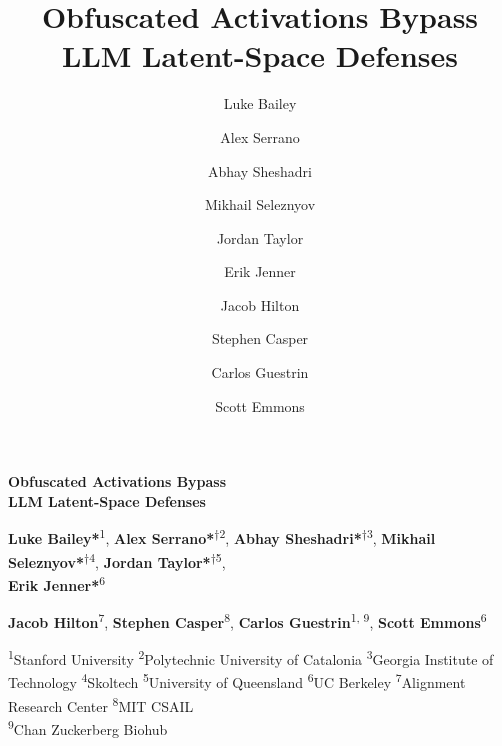 \documentclass{article}
\title{Obfuscated Activations Bypass LLM Latent-Space Defenses}
\date{} %
\author{Luke Bailey \and Alex Serrano \and Abhay Sheshadri \and Mikhail Seleznyov \and Jordan Taylor \and Erik Jenner \and Jacob Hilton \and Stephen Casper \and Carlos Guestrin \and Scott Emmons}
\begin{document}
\vspace*{-18mm}

{\centering
\LARGE\textbf{Obfuscated Activations Bypass\\LLM Latent-Space Defenses}\par
}




\begin{center}
\textbf{Luke Bailey*}\textsuperscript{1}, 
\textbf{Alex Serrano*}\textsuperscript{$\dagger$2}, 
\textbf{Abhay Sheshadri*}\textsuperscript{$\dagger$3}, 
\textbf{Mikhail Seleznyov*}\textsuperscript{$\dagger$4},
\textbf{Jordan Taylor*}\textsuperscript{$\dagger$5},\\
\textbf{Erik Jenner*}\textsuperscript{6}

\vspace{0.1cm}
\textbf{Jacob Hilton}\textsuperscript{7}, \textbf{Stephen Casper}\textsuperscript{8}, \textbf{Carlos Guestrin}\textsuperscript{1, 9}, \textbf{Scott Emmons}\textsuperscript{6}

\vspace{0.1cm}
\small{\textsuperscript{1}Stanford University \quad 
\textsuperscript{2}Polytechnic University of Catalonia 
\quad \textsuperscript{3}Georgia Institute of Technology 
\quad \textsuperscript{4}Skoltech  
\quad \textsuperscript{5}University of Queensland
\quad \textsuperscript{6}UC Berkeley 
\quad \textsuperscript{7}Alignment Research Center 
\quad \textsuperscript{8}MIT CSAIL} \\ 
\quad \textsuperscript{9}Chan Zuckerberg Biohub 

{\let\thefootnote\relax{}
}
\end{center}
\end{document}
